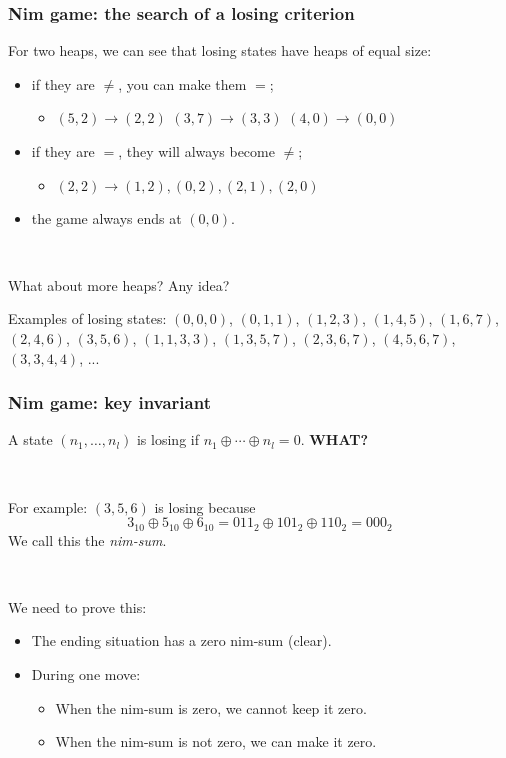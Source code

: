 \documentclass[12pt]{beamer}
\begin{document}
\begin{frame}
\frametitle{Nim game: the search of a losing criterion}
For two heaps, we can see that losing states have heaps of equal size:
\begin{itemize}
\item if they are $\neq$, you can make them $=$;
\begin{itemize} \item $(5,2) \rightarrow (2,2)$ \quad $(3,7) \rightarrow (3,3)$ \quad $(4,0) \rightarrow (0,0)$ \end{itemize}
\item if they are $=$, they will always become $\neq$;
\begin{itemize} \item $(2,2) \rightarrow (1,2), (0,2), (2,1), (2,0)$ \end{itemize}
\item the game always ends at $(0,0)$.
\end{itemize}

~

What about more heaps? Any idea?

Examples of losing states: $(0,0,0)$, $(0,1,1)$, $(1,2,3)$, $(1,4,5)$, $(1,6,7)$, $(2,4,6)$, $(3,5,6)$, $(1,1,3,3)$, $(1,3,5,7)$, $(2,3,6,7)$, $(4,5,6,7)$, $(3,3,4,4)$, ...
\end{frame}

\begin{frame}
\frametitle{Nim game: key invariant}
A state $(n_1,\ldots,n_l)$ is losing if $n_1 \oplus \cdots \oplus n_l = 0$. \textbf{WHAT?}

~

For example: $(3,5,6)$ is losing because
\[3_{10} \oplus 5_{10} \oplus 6_{10} = 011_2 \oplus 101_2 \oplus 110_2 = 000_2 \]
We call this the \emph{nim-sum}.

~

We need to prove this:
\begin{itemize}
\item The ending situation has a zero nim-sum (clear).
\item During one move:
\begin{itemize}
\item When the nim-sum is zero, we cannot keep it zero.
\item When the nim-sum is not zero, we can make it zero.
\end{itemize}
\end{itemize}
\end{frame}
\end{document}

